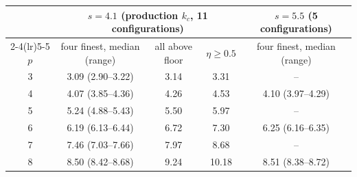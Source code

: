 \begin{tabular}{ccccc}
\toprule
 & \multicolumn{3}{c}{$s=4.1$ (production $k_c$, 11 configurations)} & $s=5.5$ (5 configurations) \\
\cmidrule(lr){2-4}\cmidrule(lr){5-5}
$p$ & four finest, median (range) & all above floor & $\eta\ge0.5$ & four finest, median (range) \\
\midrule
3 & 3.09 (2.90--3.22) & 3.14 & 3.31 & -- \\
4 & 4.07 (3.85--4.36) & 4.26 & 4.53 & 4.10 (3.97--4.29) \\
5 & 5.24 (4.88--5.43) & 5.50 & 5.97 & -- \\
6 & 6.19 (6.13--6.44) & 6.72 & 7.30 & 6.25 (6.16--6.35) \\
7 & 7.46 (7.03--7.66) & 7.97 & 8.68 & -- \\
8 & 8.50 (8.42--8.68) & 9.24 & 10.18 & 8.51 (8.38--8.72) \\
\bottomrule
\end{tabular}
